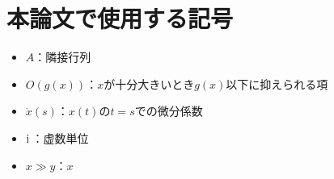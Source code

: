\documentclass[../main]{subfiles}
\begin{document}
\chapter*{本論文で使用する記号}
\begin{itemize}
    \item 
    $A$：隣接行列
    \item
    $O(g(x))$：$x$が十分大きいとき$g(x)$以下に抑えられる項
    \item
    $\dot{x}(s)$：$x(t)$の$t=s$での微分係数
    \item
    ${\mathrm i\,}$：虚数単位
    \item
    $x\gg y$：$x$
\end{itemize}
\end{document}
